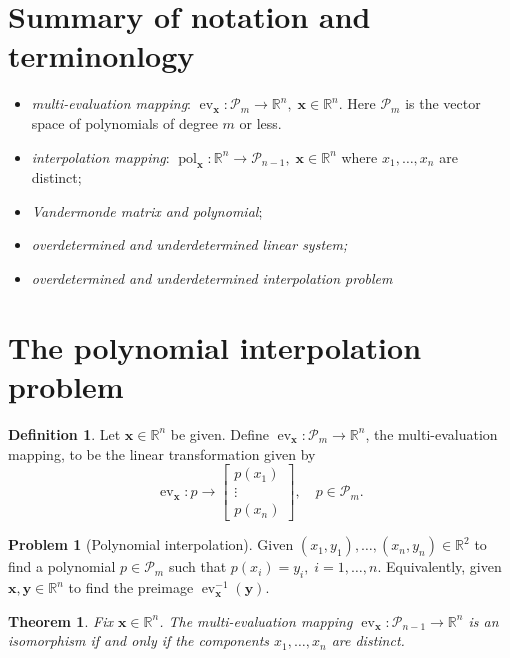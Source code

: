 \documentclass[12pt]{article}
\newtheorem{theorem}[proposition]{Theorem}
\theoremstyle{definition}
\newtheorem{definition}[proposition]{Definition}
\newtheorem{problem}[proposition]{Problem}
\newcommand{\bmat}[1]{\begin{bmatrix}#1\end{bmatrix}}
\newcommand{\bx}{\mathbf{x}}
\newcommand{\by}{\mathbf{y}}
\newcommand{\ev}{\operatorname{ev}}
\newcommand{\pol}{\operatorname{pol}}
\newcommand{\cP}{\mathcal{P}}
\newcommand{\Rset}{\mathbb{R}}
\begin{document}
\section{Summary of notation and terminonlogy}
\begin{itemize}
\item \emph{multi-evaluation mapping}: $\ev_{\bx}: \cP_m \to \Rset^n,\; 
  \bx\in\Rset^n$.  Here $\cP_m$ is the vector space of polynomials of
  degree $m$ or less. 
\item \emph{interpolation mapping}: $\pol_{\bx}: \Rset^{n} \to
  \cP_{n-1},\; \bx\in \Rset^{n}$ where $x_1,\ldots,x_{n}$ are
  distinct;
\item \emph{Vandermonde matrix and polynomial};
\item \emph{overdetermined and underdetermined linear system;}
\item \emph{overdetermined and underdetermined interpolation problem}
\end{itemize}

\section{The polynomial interpolation problem}
\begin{definition}
  Let $\bx\in \Rset^n$ be given.  Define $\ev_{\bx}:\cP_m\to
  \Rset^n$, the multi-evaluation mapping, to be the linear
  transformation given by
  \[ \ev_{\bx} : p \to \bmat{p(x_1)\\ \vdots \\ p(x_n)},\quad
  p\in \cP_m.\]
\end{definition}

\begin{problem}[Polynomial interpolation]
Given $(x_1,y_1),\ldots, (x_n,y_n)\in \Rset^2$
to find a polynomial $p\in \cP_m$ such that $p(x_i)=y_i,\;
i=1,\ldots, n$.  Equivalently, given $\bx,\by\in \Rset^n$ to find the
preimage $\ev_{\bx}^{-1}(\by)$.
\end{problem}

\begin{theorem}
  Fix $\bx\in \Rset^{n}$.  The multi-evaluation mapping
  $\ev_{\bx}:\cP_{n-1}\to \Rset^{n}$  is an isomorphism if and only
  if the components $x_1,\ldots, x_n$ are distinct.
\end{theorem}
\end{document}
